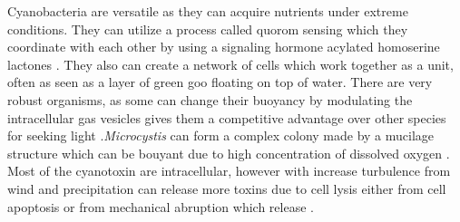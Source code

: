 Cyanobacteria are versatile as they can acquire nutrients under extreme conditions. They can utilize a process called quorom sensing which they coordinate with each other by using a signaling hormone acylated homoserine lactones \cite{van_mooy_quorum_2012}. They also can create a network of cells which work together as a unit, often as seen as a layer of green goo floating on top of water.  There are very robust organisms, as some can change their buoyancy by modulating the intracellular gas vesicles gives them a competitive advantage over other species for seeking light \cite{feng_how_2018}.\emph{Microcystis} can form a complex colony made by a mucilage structure which can be bouyant due to high concentration of dissolved oxygen \cite{xiao_colony_2018}. %
Most of the cyanotoxin are intracellular, however with increase turbulence from wind and precipitation can release more toxins due to cell lysis either from cell apoptosis or from mechanical abruption which release \cite{rohrlack_fate_2007}. %















